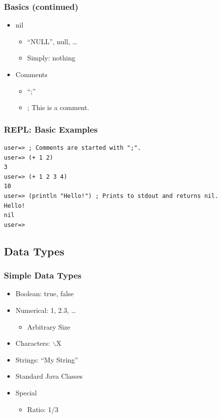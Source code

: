 \documentclass{beamer}
\begin{document}
  \begin{frame}
      \frametitle{Basics (continued)}

      \begin{itemize}
          \item nil
              \begin{itemize}
                  \item ``NULL'', null, \ldots
                  \item Simply: nothing
              \end{itemize}
          \item Comments
              \begin{itemize}
                  \item ``;''
                  \item ; This is a comment.
              \end{itemize}
      \end{itemize}
  \end{frame}

\begin{frame}[fragile]
\frametitle{REPL: Basic Examples}
\begin{lstlisting}[basicstyle=\scriptsize]
user=> ; Comments are started with ";".
user=> (+ 1 2) 
3
user=> (+ 1 2 3 4) 
10
user=> (println "Hello!") ; Prints to stdout and returns nil.
Hello!
nil
user=>
\end{lstlisting}
\end{frame}

\subsection{Data Types}
  \begin{frame}
      \frametitle{Simple Data Types}

      \begin{itemize}
          \item Boolean: true, false
          \item Numerical: 1, 2.3, \ldots
              \begin{itemize}
                  \item Arbitrary Size
              \end{itemize}
          \item Characters: $\backslash$X
          \item Strings: ``My String''
          \item Standard Java Classes
          \item Special
              \begin{itemize}
                  \item Ratio: 1/3
              \end{itemize}
      \end{itemize}
  \end{frame}
\end{document}
